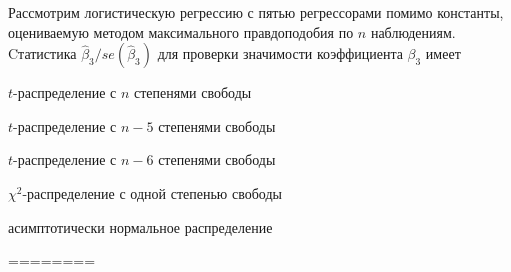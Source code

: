 
\begin{question}
Рассмотрим логистическую регрессию с пятью регрессорами помимо
константы, оцениваемую методом максимального правдоподобия по \(n\)
наблюдениям. Cтатистика \(\hat \beta_3 / se(\hat\beta_3)\) для проверки
значимости коэффициента \(\beta_3\) имеет
\begin{answerlist}
  \item \(t\)-распределение с \(n\) степенями свободы
  \item \(t\)-распределение с \(n-5\) степенями свободы
  \item \(t\)-распределение с \(n-6\) степенями свободы
  \item \(\chi^2\)-распределение с одной степенью свободы
  \item асимптотически нормальное распределение
\end{answerlist}
\end{question}

\begin{solution}
========
\end{solution}

